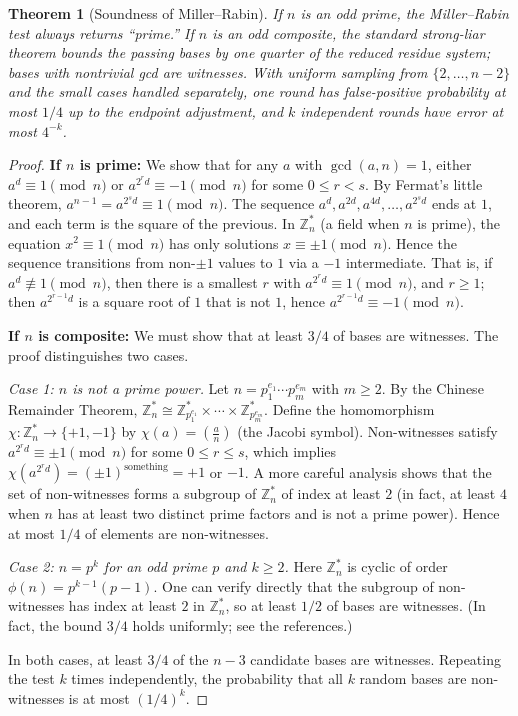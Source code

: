 \documentclass[twoside,12pt]{book}
\theoremstyle{plain}
\newtheorem{theorem}{Theorem}[chapter]
\theoremstyle{definition}
\theoremstyle{remark}
\begin{document}
\begin{theorem}[Soundness of Miller--Rabin]
\label{thm:miller-rabin}
If $n$ is an odd prime, the Miller--Rabin test always returns ``prime.'' If
$n$ is an odd composite, the standard strong-liar theorem bounds the passing
bases by one quarter of the reduced residue system; bases with nontrivial gcd
are witnesses. With uniform sampling from $\{2,\ldots,n-2\}$ and the small
cases handled separately, one round has false-positive probability at most
$1/4$ up to the endpoint adjustment, and $k$ independent rounds have error at
most $4^{-k}$.
\end{theorem}

\begin{proof}
\textbf{If $n$ is prime:} We show that for any $a$ with $\gcd(a, n) = 1$, either $a^d \equiv 1 \pmod{n}$ or $a^{2^r d} \equiv -1 \pmod{n}$ for some $0 \leq r < s$. By Fermat's little theorem, $a^{n-1} = a^{2^s d} \equiv 1 \pmod{n}$. The sequence $a^d, a^{2d}, a^{4d}, \ldots, a^{2^s d}$ ends at $1$, and each term is the square of the previous. In $\mathbb{Z}_n^*$ (a field when $n$ is prime), the equation $x^2 \equiv 1 \pmod{n}$ has only solutions $x \equiv \pm 1 \pmod{n}$. Hence the sequence transitions from non-$\pm 1$ values to $1$ via a $-1$ intermediate. That is, if $a^d \not\equiv 1 \pmod{n}$, then there is a smallest $r$ with $a^{2^r d} \equiv 1 \pmod{n}$, and $r \geq 1$; then $a^{2^{r-1} d}$ is a square root of $1$ that is not $1$, hence $a^{2^{r-1} d} \equiv -1 \pmod{n}$.

\textbf{If $n$ is composite:} We must show that at least $3/4$ of bases are witnesses. The proof distinguishes two cases.

\emph{Case 1: $n$ is not a prime power.} Let $n = p_1^{e_1} \cdots p_m^{e_m}$ with $m \geq 2$. By the Chinese Remainder Theorem, $\mathbb{Z}_n^* \cong \mathbb{Z}_{p_1^{e_1}}^* \times \cdots \times \mathbb{Z}_{p_m^{e_m}}^*$. Define the homomorphism $\chi : \mathbb{Z}_n^* \to \{+1, -1\}$ by $\chi(a) = \left(\frac{a}{n}\right)$ (the Jacobi symbol). Non-witnesses satisfy $a^{2^r d} \equiv \pm 1 \pmod{n}$ for some $0 \leq r \leq s$, which implies $\chi(a^{2^r d}) = (\pm 1)^{\text{something}} = +1$ or $-1$. A more careful analysis shows that the set of non-witnesses forms a subgroup of $\mathbb{Z}_n^*$ of index at least $2$ (in fact, at least $4$ when $n$ has at least two distinct prime factors and is not a prime power). Hence at most $1/4$ of elements are non-witnesses.

\emph{Case 2: $n = p^k$ for an odd prime $p$ and $k \geq 2$.} Here $\mathbb{Z}_n^*$ is cyclic of order $\phi(n) = p^{k-1}(p-1)$. One can verify directly that the subgroup of non-witnesses has index at least $2$ in $\mathbb{Z}_n^*$, so at least $1/2$ of bases are witnesses. (In fact, the bound $3/4$ holds uniformly; see the references.)

In both cases, at least $3/4$ of the $n - 3$ candidate bases are witnesses. Repeating the test $k$ times independently, the probability that all $k$ random bases are non-witnesses is at most $(1/4)^k$.
\end{proof}
\end{document}
